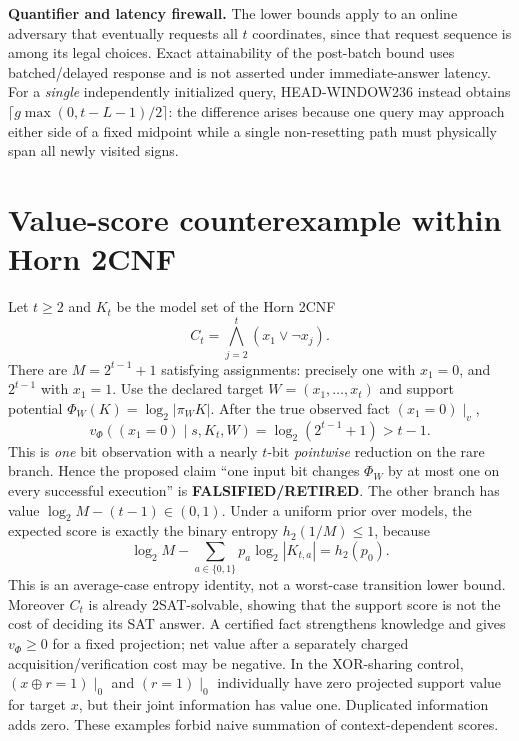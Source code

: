 \documentclass[10pt]{article}
\begin{document}
\noindent\textbf{Quantifier and latency firewall.} The lower bounds apply to an online adversary that eventually requests all $t$ coordinates, since that request sequence is among its legal choices. Exact attainability of the post-batch bound uses batched/delayed response and is not asserted under immediate-answer latency. For a \emph{single} independently initialized query, HEAD-WINDOW236 instead obtains $\lceil g\max(0,t-L-1)/2\rceil$: the difference arises because one query may approach either side of a fixed midpoint while a single non-resetting path must physically span all newly visited signs.

\section{Value-score counterexample within Horn 2CNF}
Let $t\ge2$ and $K_t$ be the model set of the Horn 2CNF
\[C_t=\bigwedge_{j=2}^{t}(x_1\lor\neg x_j).\]
There are $M=2^{t-1}+1$ satisfying assignments: precisely one with $x_1=0$, and $2^{t-1}$ with $x_1=1$. Use the declared target $W=(x_1,\ldots,x_t)$ and support potential $\Phi_W(K)=\log_2|\pi_W K|$. After the true observed fact $(x_1=0)\mid_v$,
\[\boxed{v_\Phi((x_1=0)\mid s,K_t,W)=\log_2(2^{t-1}+1)>t-1.}\]
This is \emph{one} bit observation with a nearly $t$-bit \emph{pointwise} reduction on the rare branch. Hence the proposed claim ``one input bit changes $\Phi_W$ by at most one on every successful execution'' is \textbf{FALSIFIED/RETIRED}. The other branch has value $\log_2 M-(t-1)\in(0,1)$. Under a uniform prior over models, the expected score is exactly the binary entropy $h_2(1/M)\le1$, because
\[\log_2M-\sum_{a\in\{0,1\}}p_a\log_2|K_{t,a}|=h_2(p_0).\]
This is an average-case entropy identity, not a worst-case transition lower bound. Moreover $C_t$ is already 2SAT-solvable, showing that the support score is not the cost of deciding its SAT answer. A certified fact strengthens knowledge and gives $v_\Phi\ge0$ for a fixed projection; net value after a separately charged acquisition/verification cost may be negative. In the XOR-sharing control, $(x\oplus r=1)\mid_0$ and $(r=1)\mid_0$ individually have zero projected support value for target $x$, but their joint information has value one. Duplicated information adds zero. These examples forbid naive summation of context-dependent scores.
\end{document}

